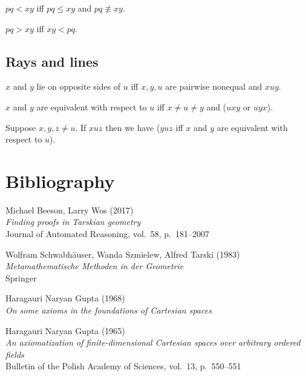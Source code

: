 \documentclass[10pt,a4paper,parskip=half,numbers=endperiod,headings=standardclasses,parskip]{scrbook}
\newcommand{\NotCong}[4]{#1 #2 \not\equiv #3 #4}
\newcommand{\Betw}[3]{#1 #2 #3}
\newcommand{\Leq}[4]{#1 #2 \leq #3 #4}
\newcommand{\Less}[4]{#1 #2 < #3 #4}
\newcommand{\Greater}[4]{#1 #2 > #3 #4}
\begin{document}
  \begin{forthel}
    \begin{definition}
      $\Less{p}{q}{x}{y}$ iff $\Leq{p}{q}{x}{y}$ and $\NotCong{p}{q}{x}{y}$.
    \end{definition}

    \begin{definition}
      $\Greater{p}{q}{x}{y}$ iff $\Less{x}{y}{p}{q}$.
    \end{definition}
  \end{forthel}



  \section{Rays and lines}

  \begin{forthel}
    \begin{definition}
      $x$ and $y$ lie on opposite sides of $u$ iff
      $x, y, u$ are pairwise nonequal and $\Betw{x}{u}{y}$.
    \end{definition}

    \begin{definition}
      $x$ and $y$ are equivalent with respect to $u$ iff $x\neq u \neq y$ and ($\Betw{u}{x}{y}$ or $\Betw{u}{y}{x}$).
    \end{definition}

    \begin{lemma}
      Suppose $x,y,z \neq u$.
      If $\Betw{x}{u}{z}$
      then we have
        ($\Betw{y}{u}{z}$ iff $x$ and $y$ are equivalent with respect to $u$).
    \end{lemma}
  \end{forthel}

  \appendix
  \chapter*{Bibliography}

  Michael Beeson, Larry Wos (2017)
  \\ \textit{Finding proofs in Tarskian geometry}
  \\ Journal of Automated Reasoning, vol.~58, p.~181--2007

  Wolfram Schwabhäuser, Wanda Szmielew, Alfred Tarski (1983)
  \\ \textit{Metamathematische Methoden in der Geometrie}
  \\ Springer

  Haragauri Naryan Gupta (1968)
  \\ \textit{On some axioms in the foundations of Cartesian spaces}

  Haragauri Naryan Gupta (1965)
  \\ \textit{An axiomatization of finite-dimensional Cartesian spaces over arbitrary ordered fields}
  \\ Bulletin of the Polish Academy of Sciences, vol.~13, p.~550--551

\end{document}
